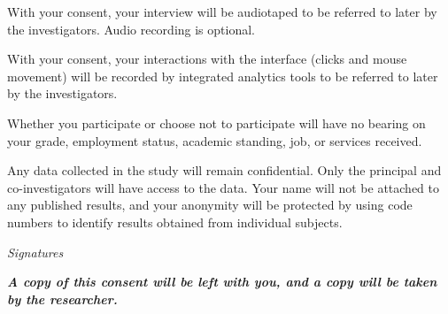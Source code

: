 \documentclass{article}
\begin{document}
\begin{appendices}
With your consent, your interview will be audiotaped to be referred to later by the investigators. Audio recording is optional.

With your consent, your interactions with the interface (clicks and mouse movement) will be recorded by integrated analytics tools to be referred to later by the investigators. 

Whether you participate or choose not to participate will have no bearing on your grade, employment status, academic standing, job, or services received.

Any data collected in the study will remain confidential.  Only the principal and co-investigators will have access to the data.  Your name will not be attached to any published results, and your anonymity will be protected by using code numbers to identify results obtained from individual subjects.

\begin{center}
    \textit{Signatures}
\end{center}

\emph{\textbf{A copy of this consent will be left with you, and a copy
will be taken by the researcher.}}


\end{appendices}



%
%
%



\end{document}
